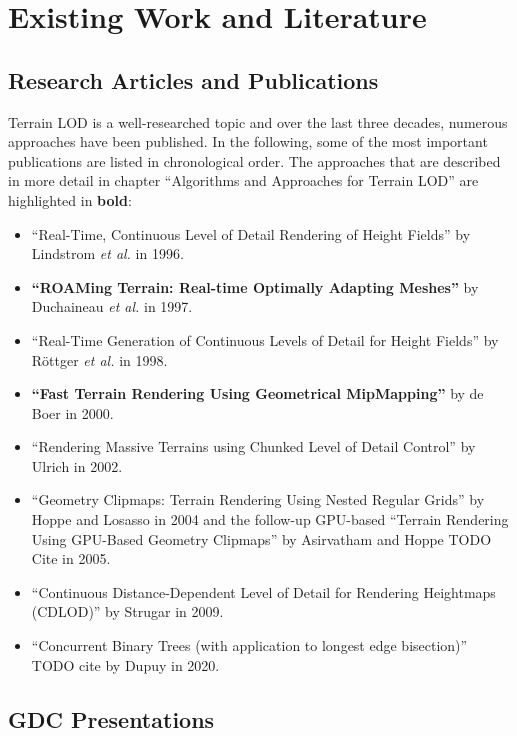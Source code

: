 \chapter{Existing Work and Literature}
\section{Research Articles and Publications}
Terrain LOD is a well-researched topic and over the last three decades, numerous approaches have been published.
In the following, some of the most important publications are listed in chronological order.
The approaches that are described in more detail in chapter ``Algorithms and Approaches for Terrain LOD'' are highlighted in \textbf{bold}:
\begin{itemize}
  \item ``Real-Time, Continuous Level of Detail Rendering of Height Fields'' \cite{lindstrom1996} by Lindstrom \textit{et al.} in 1996.
  \item \textbf{``ROAMing Terrain: Real-time Optimally Adapting Meshes''} \cite{roam} by Duchaineau \textit{et al.} in 1997.
  \item ``Real-Time Generation of Continuous Levels of Detail for Height Fields'' \cite{rottgerpaper} by Röttger \textit{et al.} in 1998.
  \item \textbf{``Fast Terrain Rendering Using Geometrical MipMapping''}  \cite{geomipmapping} by de Boer in 2000.
  \item ``Rendering Massive Terrains using Chunked Level of Detail Control'' \cite{chunkedlod} by Ulrich in 2002.
  \item ``Geometry Clipmaps: Terrain Rendering Using Nested Regular Grids'' \cite{geomclipmaps} by Hoppe and Losasso in 2004 and the follow-up GPU-based ``Terrain Rendering Using GPU-Based Geometry Clipmaps'' by Asirvatham and Hoppe TODO Cite in 2005.
  \item ``Continuous Distance-Dependent Level of Detail for Rendering Heightmaps (CDLOD)'' \cite{cdlod} by Strugar in 2009.
  \item ``Concurrent Binary Trees (with application to longest edge bisection)'' TODO cite by Dupuy in 2020.
\end{itemize}

\section{GDC Presentations}

